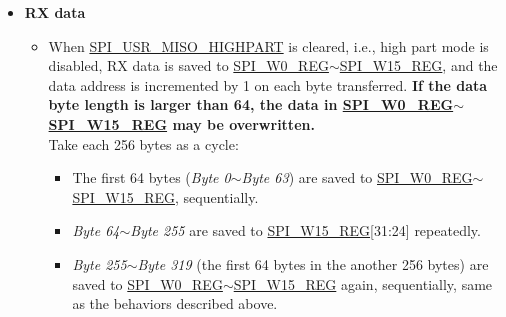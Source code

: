 \documentclass[main\_\_EN.tex]{subfiles}
\begin{document}
\begin{itemize}
\begin{itemize}
        \begin{itemize}
            \item The first 32 bytes (\emph{Byte 0}$\sim$\emph{Byte 31}) are read from \hyperref[regdesc:SPIW8REG]{SPI\_W8\_REG}$\sim$\hyperref[regdesc:SPIW15REG]{SPI\_W15\_REG}, sequentially.
            \item \emph{Byte 32}$\sim$\emph{Byte 255} are read from \hyperref[regdesc:SPIW15REG]{SPI\_W15\_REG}[31:24] repeatedly.
            \item The other bytes (\emph{Byte 256} and \emph{Byte 257}) are read from \hyperref[regdesc:SPIW8REG]{SPI\_W8\_REG}[7:0] and \hyperref[regdesc:SPIW8REG]{SPI\_W8\_REG}[15:8] again, sequentially. The logic is: 
            \begin{itemize}
                \item The address to read data for \emph{Byte 256} is the result of (256 \% 32 = 0), i.e., \hyperref[regdesc:SPIW8REG]{SPI\_W8\_REG}[7:0]. 
                \item The address to read data for \emph{Byte 257} is the result of (257 \% 32 = 1), i.e., \hyperref[regdesc:SPIW8REG]{SPI\_W8\_REG}[15:8].
            \end{itemize}
        \end{itemize}
    \end{itemize}
    
    \item \textbf{RX data}
    \begin{itemize}
        \item When \hyperref[fielddesc:SPIUSRMISOHIGHPART]{SPI\_USR\_MISO\_HIGHPART} is cleared, i.e., high part mode is disabled, RX data is saved to \hyperref[regdesc:SPIW0REG]{SPI\_W0\_REG}$\sim$\hyperref[regdesc:SPIW15REG]{SPI\_W15\_REG}, and the data address is incremented by 1 on each byte transferred. \textbf{If the data byte length is larger than 64, the data in \hyperref[regdesc:SPIW0REG]{SPI\_W0\_REG}$\sim$\hyperref[regdesc:SPIW15REG]{SPI\_W15\_REG} may be overwritten.} \\
        Take each 256 bytes as a cycle:
        \begin{itemize}
            \item The first 64 bytes (\emph{Byte 0}$\sim$\emph{Byte 63}) are saved to \hyperref[regdesc:SPIW0REG]{SPI\_W0\_REG}$\sim$\hyperref[regdesc:SPIW15REG]{SPI\_W15\_REG}, sequentially.
            \item \emph{Byte 64}$\sim$\emph{Byte 255} are saved to \hyperref[regdesc:SPIW15REG]{SPI\_W15\_REG}[31:24] repeatedly.
            \item \emph{Byte 255}$\sim$\emph{Byte 319} (the first 64 bytes in the another 256 bytes) are saved to \hyperref[regdesc:SPIW0REG]{SPI\_W0\_REG}$\sim$\hyperref[regdesc:SPIW15REG]{SPI\_W15\_REG} again, sequentially, same as the behaviors described above.
        \end{itemize}
        

\end{itemize}
\end{itemize}
\end{document}
